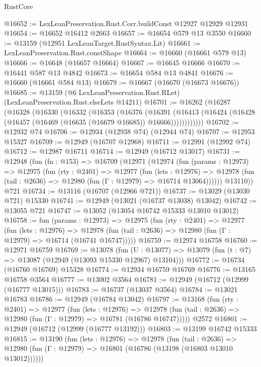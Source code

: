 \begin{lexlean}{RustCore}
\begin{coremodule}
@16652 := LexLeanPreservation.Rust.Corr.buildConst @12927 @12929 @12931
@16654 := @16652 @16412 @2663
@16657 := @16654 @579 @13 @3550
@16660 := @13159 (@12951 LexLeanTarget.RustSyntax.Lit)
@16661 := LexLeanPreservation.Rust.constShape
@16664 := @16660 (@16661 @579 @13)
@16666 := @16648 (@16657 @16664)
@16667 := @16645 @16666
@16670 := @16441 @587 @13 @4842
@16673 := @16654 @584 @13 @4841
@16676 := @16660 (@16661 @584 @13)
@16679 := @16667 (@16670 (@16673 @16676))
@16685 := @13159 (@6 LexLeanPreservation.Rust.RLet) (LexLeanPreservation.Rust.elseLets @14211)
@16701 := @16262
    (@16287
      (@16328
        (@16330
          (@16332
            (@16353
              (@16376
                (@16391
                  (@16413
                    (@16424 (@16428 (@16457 (@16469 (@16635 (@16679 @16685)) @16666))))))))))))
@16702 := @12932 @74
@16706 := @12934 (@12938 @74) (@12944 @74)
@16707 := @12953 @15327
@16709 := @12949 (@16707 @12968)
@16711 := @12991 (@12992 @74)
@16712 := @12987 @16711
@16714 := @12949 (@16712 @13017)
@16731 := @12948
    (fun (fn : @153) =>
    @16709
      (@12971
        (@12974
          (fun (params : @12973) =>
          @12975
            (fun (rty : @2401) =>
            @12977
              (fun (lets : @12976) =>
              @12978 (fun (tail : @2636) => @12980 (fun (Γ : @12979) => @16714 @13064))))))
        @13110))
    @721
@16734 := @13116 (@16707 (@12966 @721))
@16737 := @13029 (@13030 @721) @15330
@16741 := @12949 (@13021 (@16737 @13038) @13042)
@16742 := @13055 @721
@16747 := @13052 (@13054 @16742 @15333 @13010 @13012)
@16758 := fun (params : @12973) =>
  @12975
    (fun (rty : @2401) =>
    @12977
      (fun (lets : @12976) =>
      @12978 (fun (tail : @2636) => @12980 (fun (Γ : @12979) => @16714 (@16741 @16747)))))
@16759 := @12974 @16758
@16760 := @12971 @16759
@16769 := @13078
    (fun (U : @13077) => @13079 (fun (t : @7) => @13087 (@12949 (@13093 @15330 @12967) @13104)))
@16772 := @16734 (@16760 @16769) @15328
@16774 := @12934 @16759 @16769
@16776 := @13165 @16758 @3564
@16777 := @13002 @3564
@16781 := @12949 (@16712 (@12999 (@16777 @13015)))
@16783 := @16737 (@13037 @3564)
@16784 := @13021 @16783
@16786 := @12949 (@16784 @13042)
@16797 := @13168
    (fun (rty : @2401) =>
    @12977
      (fun (lets : @12976) =>
      @12978 (fun (tail : @2636) => @12980 (fun (Γ : @12979) => @16781 (@16786 @16747)))))
    @2572
@16801 := @12949 (@16712 (@12999 (@16777 @13192)))
@16803 := @13199 @16742 @15333
@16815 := @13190
    (fun (lets : @12976) =>
    @12978
      (fun (tail : @2636) =>
      @12980 (fun (Γ : @12979) => @16801 (@16786 (@13198 (@16803 @13010 @13012))))))

\end{coremodule}
\end{lexlean}
